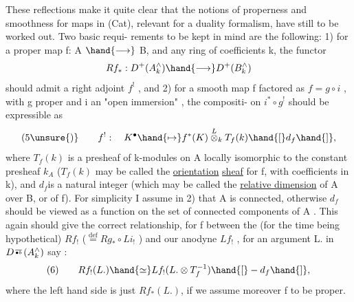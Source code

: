 
These reflections make it quite clear that the  notions
of properness and  smoothness for maps in (Cat), relevant for  a duality formalism, have still to be worked out. Two basic requi-%
rements to be kept in mind are the following: 1) for a proper map 
f: A $\hand{\longrightarrow}$ B, and any ring of coefficients k, the functor
\[ Rf_{*} : D^{+}(A^{\wedge}_{k}) \hand{\longrightarrow} D^{+}(B^{\wedge}_{k}) \]
should admit a right adjoint $f^{!}$ , and 2) for a smooth map f factored
as $f = g\circ i$ , with g proper and i an "open immersion" , the compositi-%
on  $i^{*}\circ g^{!}$\hand{$\leftarrow$} should be  expressible as
\[ (5\unsure{)} \qquad f^{!} : \quad K^{\bullet} \hand{\mapsto} f^{*}(K)\overset{L}{\otimes}_{k} T_{f}(k)\hand{[}d_{f}\hand{]} , \]
where $T_{f}(k)$ is a presheaf of k-modules on A locally isomorphic to
the constant  presheaf $k_{A}$ ($T_{f}(k)$ may be called the \uline{orientation}
\uline{sheaf} for f, with coefficients in k), and $d_{f}$\hand{|}is a natural integer
(which may be called the \uline{relative dimension} of A over B, or of f).
\hand{(}For simplicity I assume in 2) that A is connected, otherwise $d_{f}$
should be viewed as a function on the set of connected components of
A .\hand{)} This again should give the correct relationship, for f  \hand{,}
between the (for the time being hypothetical) $Rf_{!}$ ($\overset{\mathrm{def}}{=} Rg_{*}\circ Li_{!}$ ) and
 our anodyne $Lf_{!}$ , for an argument L. in $D^{\over{\bullet}{b}}(A^{\wedge}_{k})$ say :
\[ (6) \qquad Rf_{!}(L.) \hand{\simeq} Lf_{!}(L.\otimes T_{f}^{-1})\hand{[}-d_{f}\hand{]} , \]
where the  left hand side is just $Rf_{*}(L.)$, if we assume moreover
f to be proper.

